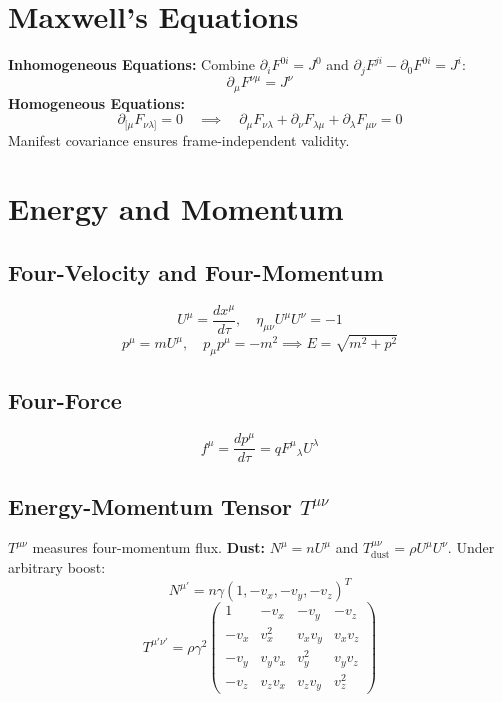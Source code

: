 \documentclass[11pt, a4paper]{report}
\begin{document}
\section{Maxwell's Equations}
\textbf{Inhomogeneous Equations:} Combine $\partial_i F^{0i} = J^0$ and $\partial_j F^{ji} - \partial_0 F^{0i} = J^i$:
\begin{equation}\label{eq:inhom-maxwell}
\partial_\mu F^{\nu\mu} = J^\nu
\end{equation}
\textbf{Homogeneous Equations:}
\begin{equation}\label{eq:hom-maxwell}
\partial_{[\mu} F_{\nu\lambda]} = 0 \quad \implies \quad \partial_\mu F_{\nu\lambda} + \partial_\nu F_{\lambda\mu} + \partial_\lambda F_{\mu\nu} = 0
\end{equation}
Manifest covariance ensures frame-independent validity.

\section{Energy and Momentum}
\subsection*{Four-Velocity and Four-Momentum}
\begin{equation}
U^\mu = \frac{dx^\mu}{d\tau}, \quad \eta_{\mu\nu}U^\mu U^\nu = -1
\end{equation}
\begin{equation}
p^\mu = mU^\mu, \quad p_\mu p^\mu = -m^2 \implies E = \sqrt{m^2 + p^2}
\end{equation}

\subsection*{Four-Force}
\begin{equation}
f^\mu = \frac{dp^\mu}{d\tau} = q {F^\mu}_\lambda U^\lambda
\end{equation}

\subsection*{Energy-Momentum Tensor $T^{\mu\nu}$}
$T^{\mu\nu}$ measures four-momentum flux.
\textbf{Dust:} $N^\mu = nU^\mu$ and $T^{\mu\nu}_{\text{dust}} = \rho U^\mu U^\nu$. Under arbitrary boost:
\begin{equation}
N^{\mu'} = n \gamma (1, -v_x, -v_y, -v_z)^T
\end{equation}
\begin{equation}
T^{\mu'\nu'} = \rho \gamma^2
\begin{pmatrix}
1 & -v_x & -v_y & -v_z \\
-v_x & v_x^2 & v_x v_y & v_x v_z \\
-v_y & v_y v_x & v_y^2 & v_y v_z \\
-v_z & v_z v_x & v_z v_y & v_z^2
\end{pmatrix}
\end{equation}
\end{document}

